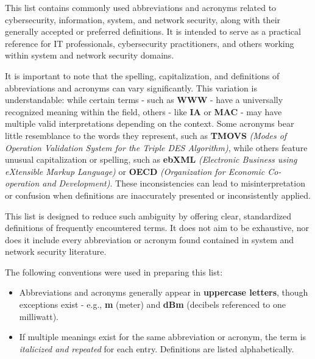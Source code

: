 %
%


This list contains commonly used abbreviations and acronyms related to cybersecurity, information, system, and network security, along with their generally accepted or preferred definitions. It is intended to serve as a practical reference for IT professionals, cybersecurity practitioners, and others working within system and network security domains.

It is important to note that the spelling, capitalization, and definitions of abbreviations and acronyms can vary significantly. This variation is understandable: while certain terms - such as \textbf{WWW} - have a universally recognized meaning within the field, others - like \textbf{IA} or \textbf{MAC} - may have multiple valid interpretations depending on the context. Some acronyms bear little resemblance to the words they represent, such as \textbf{TMOVS} \textit{(Modes of Operation Validation System for the Triple DES Algorithm)}, while others feature unusual capitalization or spelling, such as \textbf{ebXML} \textit{(Electronic Business using eXtensible Markup Language)} or \textbf{OECD} \textit{(Organization for Economic Co-operation and Development)}. These inconsistencies can lead to misinterpretation or confusion when definitions are inaccurately presented or inconsistently applied.

This list is designed to reduce such ambiguity by offering clear, standardized definitions of frequently encountered terms. It does not aim to be exhaustive, nor does it include every abbreviation or acronym found contained in system and network security literature.

The following conventions were used in preparing this list:

\begin{itemize}
    \item Abbreviations and acronyms generally appear in \textbf{uppercase letters}, though exceptions exist - e.g., \textbf{m} (meter) and \textbf{dBm} (decibels referenced to one milliwatt).
    \item If multiple meanings exist for the same abbreviation or acronym, the term is \textit{italicized and repeated} for each entry. Definitions are listed alphabetically.
\end{itemize}

